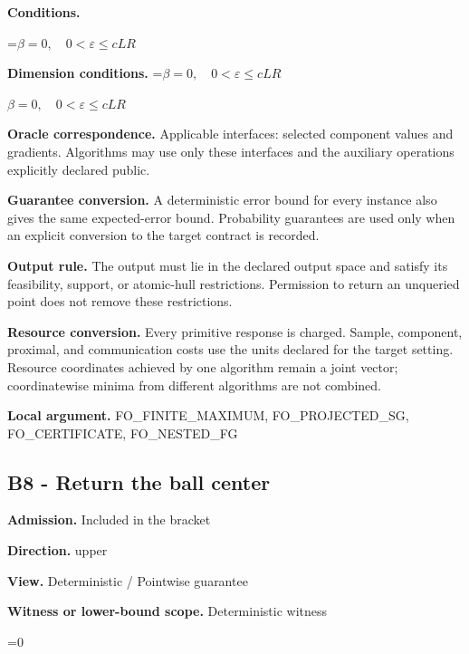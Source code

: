 \documentclass[10pt,a4paper]{article}
\newcommand{\AtlasMath}[1]{\par\begingroup\centering\setbox0=\hbox{$\displaystyle #1$}\ifdim\wd0>1.4\linewidth\typeout{ATLAS WIDE FORMULA: \the\wd0}\fi\ifdim\wd0>\linewidth\resizebox{\linewidth}{!}{\box0}\else\box0\fi\par\endgroup}
\newcommand{\AtlasInlineMath}[1]{\begingroup\setbox0=\hbox{$#1$}\ifdim\wd0>.4\linewidth\endgroup\AtlasMath{#1}\else\endgroup$#1$\fi}
\begin{document}
\textbf{Conditions.}
\AtlasMath{\beta=0,\quad0<\varepsilon\le cLR}




\textbf{Dimension conditions.} \AtlasInlineMath{\beta=0,\quad0<\varepsilon\le cLR}



\textbf{Oracle correspondence.} Applicable interfaces: selected component values and gradients. Algorithms may use only these interfaces and the auxiliary operations explicitly declared public.



\textbf{Guarantee conversion.} A deterministic error bound for every instance also gives the same expected-error bound. Probability guarantees are used only when an explicit conversion to the target contract is recorded.



\textbf{Output rule.} The output must lie in the declared output space and satisfy its feasibility, support, or atomic-hull restrictions. Permission to return an unqueried point does not remove these restrictions.



\textbf{Resource conversion.} Every primitive response is charged. Sample, component, proximal, and communication costs use the units declared for the target setting. Resource coordinates achieved by one algorithm remain a joint vector; coordinatewise minima from different algorithms are not combined.



\textbf{Local argument.} FO\_FINITE\_MAXIMUM, FO\_PROJECTED\_SG, FO\_CERTIFICATE, FO\_NESTED\_FG



\subsection{B8 - Return the ball center}


\textbf{Admission.} Included in the bracket



\textbf{Direction.} upper



\textbf{View.} Deterministic / Pointwise guarantee



\textbf{Witness or lower-bound scope.} Deterministic witness



\AtlasMath{0}
\end{document}
